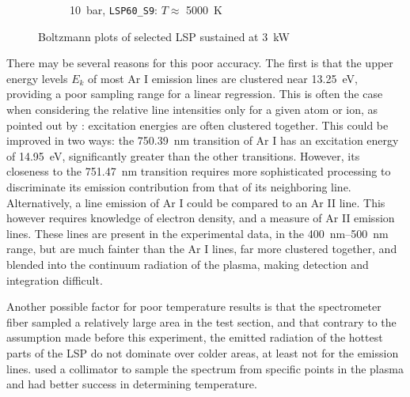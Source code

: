 \begin{figure}[h]
\begin{subfigure}[t]{0.47\textwidth}
                    \caption{\qty{10}{bar}, \texttt{LSP60\_S9}: $T \approx$ \qty{5000}{K}}
                    \label{fig:boltzmann_LSP60_S9}
                \end{subfigure}
                \caption{Boltzmann plots of selected LSP sustained at \qty{3}{kW}}
                \label{fig:boltzmannplot}
            \end{figure}

            There may be several reasons for this poor accuracy. The first is that the upper energy levels $E_k$ of most Ar I emission lines are clustered near \qty{13.25}{eV}, providing a poor sampling range for a linear regression. This is often the case when considering the relative line intensities only for a given atom or ion, as pointed out by \textcite{griemSpectroscopicTemperatureMeasurements1997}: excitation energies are often clustered together. This could be improved in two ways: the \qty{750.39}{nm} transition of Ar I has an excitation energy of \qty{14.95}{eV}, significantly greater than the other transitions. However, its closeness to the \qty{751.47}{nm} transition requires more sophisticated processing to discriminate its emission contribution from that of its neighboring line. Alternatively, a line emission of Ar I could be compared to an Ar II line. This however requires knowledge of electron density, and a measure of Ar II emission lines. These lines are present in the experimental data, in the \qtyrange{400}{500}{nm} range, but are much fainter than the Ar I lines, far more clustered together, and blended into the continuum radiation of the plasma, making detection and integration difficult.

            Another possible factor for poor temperature results is that the spectrometer fiber sampled a relatively large area in the test section, and that contrary to the assumption made before this experiment, the emitted radiation of the hottest parts of the LSP do not dominate over colder areas, at least not for the emission lines.  \textcite{nassarInvestigationLasersustainedPlasma2012} used a collimator to sample the spectrum from specific points in the plasma and had better success in determining temperature. 
    
